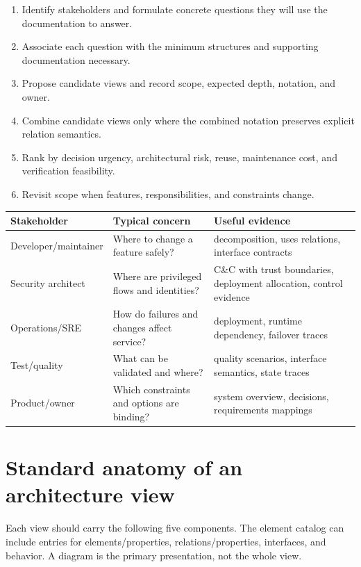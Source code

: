 \documentclass[10pt,letterpaper]{article}
\begin{document}
\begin{enumerate}
\item Identify stakeholders and formulate concrete questions they will use the documentation to answer.
\item Associate each question with the minimum structures and supporting documentation necessary.
\item Propose candidate views and record scope, expected depth, notation, and owner.
\item Combine candidate views only where the combined notation preserves explicit relation semantics.
\item Rank by decision urgency, architectural risk, reuse, maintenance cost, and verification feasibility.
\item Revisit scope when features, responsibilities, and constraints change.
\end{enumerate}
\small
\begin{tabularx}{\linewidth}{@{}YYY@{}}
\toprule
\textbf{Stakeholder} & \textbf{Typical concern} & \textbf{Useful evidence} \\
\midrule
Developer/maintainer & Where to change a feature safely? & decomposition, uses relations, interface contracts \\
Security architect & Where are privileged flows and identities? & C\&C with trust boundaries, deployment allocation, control evidence \\
Operations/SRE & How do failures and changes affect service? & deployment, runtime dependency, failover traces \\
Test/quality & What can be validated and where? & quality scenarios, interface semantics, state traces \\
Product/owner & Which constraints and options are binding? & system overview, decisions, requirements mappings \\
\bottomrule
\end{tabularx}
\normalsize
\section{Standard anatomy of an architecture view}
Each view should carry the following five components. The element catalog can include entries for elements/properties, relations/properties, interfaces, and behavior. A diagram is the primary presentation, not the whole view.
\end{document}
